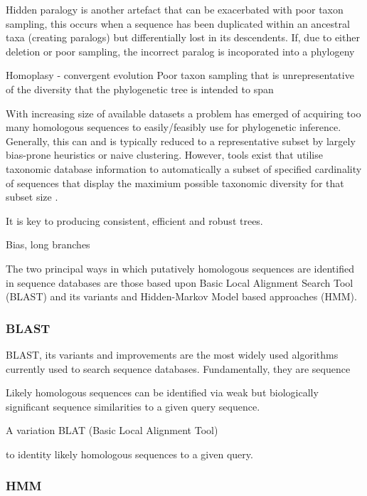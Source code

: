 Hidden paralogy is another artefact that can be exacerbated with poor taxon sampling, this occurs when a sequence has
been duplicated within an ancestral taxa (creating paralogs) but differentially lost in its descendents.  
If, due to either deletion or poor sampling, the incorrect paralog is incoporated into a phylogeny 


Homoplasy - convergent evolution
Poor taxon sampling that is unrepresentative of the diversity that the phylogenetic tree
is intended to span 



With increasing size of available datasets a problem has emerged of acquiring too many homologous 
sequences to easily/feasibly use for phylogenetic inference.  Generally, this can and is typically reduced
to a representative subset by largely bias-prone heuristics or naive clustering.  However,
tools exist that utilise taxonomic database information to automatically a subset of specified
cardinality of sequences that display the maximium possible taxonomic diversity for that subset size \citep{Zhou2014}.


It is key to producing consistent, efficient and robust trees. 

Bias, long branches


The two principal ways in which putatively homologous sequences are identified in
sequence databases are those based upon Basic Local Alignment Search Tool (BLAST) and
its variants and Hidden-Markov Model based approaches (HMM).

\subsubsection{BLAST}

BLAST, its variants and improvements are the most widely used algorithms currently used to search sequence databases.
Fundamentally, they are sequence 

Likely homologous sequences can be identified via weak but biologically significant sequence similarities to a
given query sequence.



A variation BLAT (Basic Local Alignment Tool)




to identity likely homologous sequences 
to a given query.



\subsubsection{HMM}


